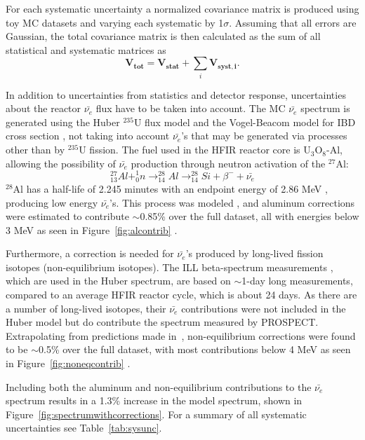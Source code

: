 For each systematic uncertainty a normalized covariance matrix is produced using toy MC datasets and varying each systematic by 1$\sigma$.
Assuming that all errors are Gaussian, the total covariance matrix is then calculated as the sum of all statistical and systematic matrices as
\begin{equation}
	\mathbf{V_{tot}} = \mathbf{V_{stat}} + \sum_{i}\mathbf{V_{syst,i}}.
\end{equation}

In addition to uncertainties from statistics and detector response, uncertainties about the reactor $\bar{\nu_{e}}$ flux have to be taken into account.
The MC $\bar{\nu_{e}}$ spectrum is generated using the Huber $^{235}$U flux model \cite{Huber} and the Vogel-Beacom model for IBD cross section \cite{Vogel:1999zy}, not taking into account $\bar{\nu_{e}}$'s that may be generated via processes other than by $^{235}$U fission.
The fuel used in the HFIR reactor core is U$_3$O$_8$-Al, allowing the possibility of $\bar{\nu_{e}}$ production through neutron activation of the $^{27}$Al:
\begin{equation}
	^{27}_{13}Al + ^1_0n \rightarrow ^{28}_{14}Al \rightarrow ^{28}_{14}Si + \beta^- + \bar{\nu_{e}}
\end{equation}
$^{28}$Al has a half-life of 2.245 minutes with an endpoint energy of 2.86 MeV \cite{ENSDF}, producing low energy $\bar{\nu_{e}}$'s.
This process was modeled \cite{ConantThesis}, and aluminum corrections were estimated to contribute $\sim$0.85\% over the full dataset, all with energies below 3 MeV as seen in Figure~\ref{fig:alcontrib} \cite{PSurukuchi:2338}. 

Furthermore, a correction is needed for $\bar{\nu_{e}}$'s produced by long-lived fission isotopes (non-equilibrium isotopes).
The ILL beta-spectrum measurements \cite{VonFeilitzsch:1982jw, Schreckenbach:1985ep, Hahn:1989zr}, which are used in the Huber spectrum, are based on $\sim$1-day long measurements, compared to an average HFIR reactor cycle, which is about 24 days.
As there are a number of long-lived isotopes, their $\bar{\nu_{e}}$ contributions were not included in the Huber model but do contribute the spectrum measured by PROSPECT.
Extrapolating from predictions made in~\cite{Mueller}, non-equilibrium corrections were found to be $\sim$0.5\% over the full dataset, with most contributions below 4 MeV as seen in Figure~\ref{fig:noneqcontrib} \cite{PSurukuchi:2346}.

Including both the aluminum and non-equilibrium contributions to the $\bar{\nu_{e}}$ spectrum results in a 1.3\% increase in the model spectrum, shown in Figure~\ref{fig:spectrumwithcorrections}.
For a summary of all systematic uncertainties see Table~\ref{tab:sysunc}.

